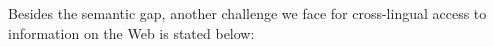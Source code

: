 
Besides the semantic gap, another challenge we face for cross-lingual access to information on the Web is stated below:

